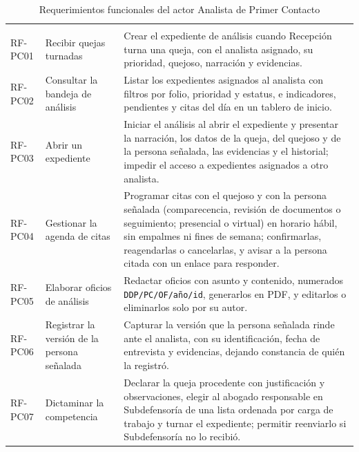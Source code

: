 	\begin{longtable}{|p{1.5cm}|p{3.6cm}|p{9.0cm}|}
		\caption{Requerimientos funcionales del actor Analista de Primer Contacto}
		\label{tab:rf_pc} \\
		\hline
		\rowcolor{headerblue}
		\headercell{ID} & \headercell{Requerimiento} & \headercell{Descripción} \\
		\hline
		\endfirsthead

		\hline
		\rowcolor{headerblue}
		\headercell{ID} & \headercell{Requerimiento} & \headercell{Descripción} \\
		\hline
		\endhead

		RF-PC01 & Recibir quejas turnadas & Crear el expediente de análisis cuando Recepción turna una
		queja, con el analista asignado, su prioridad, quejoso, narración y evidencias. \\ \hline

		RF-PC02 & Consultar la bandeja de análisis & Listar los expedientes asignados al analista con
		filtros por folio, prioridad y estatus, e indicadores, pendientes y citas del día en un tablero
		de inicio. \\ \hline

		RF-PC03 & Abrir un expediente & Iniciar el análisis al abrir el expediente y presentar la
		narración, los datos de la queja, del quejoso y de la persona señalada, las evidencias y el
		historial; impedir el acceso a expedientes asignados a otro analista. \\ \hline

		RF-PC04 & Gestionar la agenda de citas & Programar citas con el quejoso y con la persona
		señalada (comparecencia, revisión de documentos o seguimiento; presencial o virtual) en horario
		hábil, sin empalmes ni fines de semana; confirmarlas, reagendarlas o cancelarlas, y avisar a la
		persona citada con un enlace para responder. \\ \hline

		RF-PC05 & Elaborar oficios de análisis & Redactar oficios con asunto y contenido, numerados
		\texttt{DDP/PC/OF/año/id}, generarlos en PDF, y editarlos o eliminarlos solo por su autor.
		\\ \hline

		RF-PC06 & Registrar la versión de la persona señalada & Capturar la versión que la persona
		señalada rinde ante el analista, con su identificación, fecha de entrevista y evidencias,
		dejando constancia de quién la registró. \\ \hline

		RF-PC07 & Dictaminar la competencia & Declarar la queja procedente con justificación y
		observaciones, elegir al abogado responsable en Subdefensoría de una lista ordenada por carga
		de trabajo y turnar el expediente; permitir reenviarlo si Subdefensoría no lo recibió.
		\\ \hline


\end{longtable}
